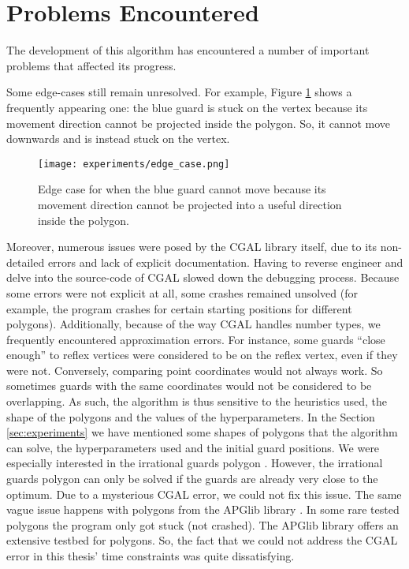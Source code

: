 \section{Problems Encountered}
\label{sec:problems}
The development of this algorithm has encountered a number of important problems that affected its progress.

Some edge-cases still remain unresolved. For example, Figure \ref{fig:edge} shows a frequently appearing one: the blue guard is stuck on the vertex because its movement direction cannot be projected inside the polygon. So, it cannot move downwards and is instead stuck on the vertex.

\begin{figure}[h!]
    \centering
    \texttt{[image: experiments/edge\_case.png]}
    \caption{Edge case for when the blue guard cannot move because its movement direction cannot be projected into a useful direction inside the polygon.}
    \label{fig:edge}
\end{figure}

Moreover, numerous issues were posed by the CGAL library itself, due to its non-detailed errors and lack of explicit documentation. Having to reverse engineer and delve into the source-code of CGAL slowed down the debugging process. Because some errors were not explicit at all, some crashes remained unsolved (for example, the program crashes for certain starting positions for different polygons). Additionally, because of the way CGAL handles number types, we frequently encountered approximation errors. For instance, some guards ``close enough'' to reflex vertices were considered to be on the reflex vertex, even if they were not. Conversely, comparing point coordinates would not always work. So sometimes guards with the same coordinates would not be considered to be overlapping.
As such, the algorithm is thus sensitive to the heuristics used, the shape of the polygons and the values of the hyperparameters. In the Section \ref{sec:experiments} we have mentioned some shapes of polygons that the algorithm can solve, the hyperparameters used and the initial guard positions.
We were especially interested in the irrational guards polygon \cite{abrahamsen2021art}. However, the irrational guards polygon can only be solved if the guards are already very close to the optimum. Due to a mysterious CGAL error, we could not fix this issue.
The same vague issue happens with polygons from the APGlib library \cite{art-gallery-instances-page}. In some rare tested polygons the program only got stuck (not crashed). The APGlib library offers an extensive testbed for polygons. So, the fact that we could not address the CGAL error in this thesis' time constraints was quite dissatisfying.

